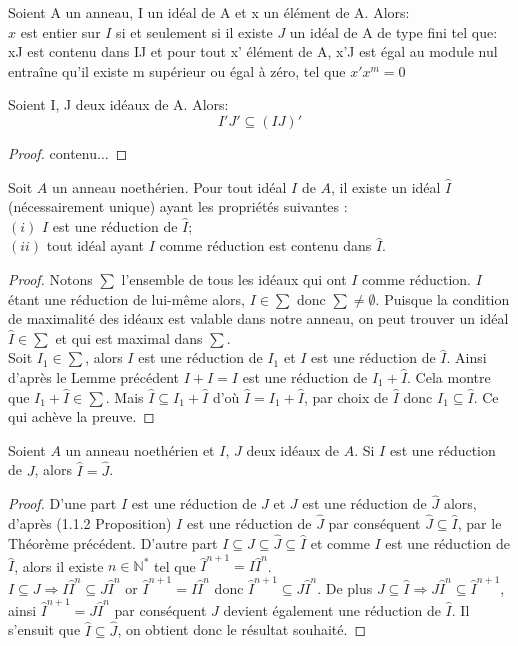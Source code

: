 \begin{maproposition}
	Soient A un anneau, I un idéal de A et x un élément de A. Alors:\\
	$x$ est entier sur $I$ si et seulement si il existe $J$ un idéal de A de type fini tel que: xJ est contenu dans IJ et pour tout x' élément de A, x'J est égal au module nul entraîne qu'il existe m supérieur ou égal à zéro, tel que $x'x^m = 0$
\end{maproposition}
\begin{moncorollaire}
	Soient I, J deux idéaux de A. Alors:
	\[ I'J' \subseteq (IJ)' \]
\end{moncorollaire}
\begin{proof}
	contenu...
\end{proof}
\begin{montheoreme}
	Soit $A$ un anneau noethérien.
	Pour tout idéal $I$ de $A$, il existe un idéal $\hat{I}$ (nécessairement unique) ayant les propriétés suivantes : \\
	$(i)$ $I$ est une réduction de $\hat{I}$;\\
	$(ii)$ tout idéal ayant $I$ comme réduction est contenu dans $\hat{I}$.
\end{montheoreme}
\begin{proof}
	Notons $\displaystyle \sum$ l'ensemble de tous les idéaux qui ont $I$ comme réduction. $I$ étant une réduction de lui-même alors, $I \in \displaystyle \sum$ donc $\displaystyle \sum \neq \emptyset$. Puisque la condition de maximalité des idéaux est valable dans notre anneau, on peut trouver un idéal $\hat{I} \in \displaystyle \sum$ et qui est maximal dans $\displaystyle \sum$.\\
	Soit $I_1 \in \displaystyle \sum$, alors $I$ est une réduction de $I_1$ et $I$ est une réduction de $\hat{I}$. Ainsi d'après le Lemme précédent $I+I=I$ est une réduction de $I_1+\hat{I}$. Cela montre que $I_1+\hat{I} \in \displaystyle \sum$. Mais $\hat{I} \subseteq I_1+\hat{I}$ d'où $\hat{I} = I_1+\hat{I}$, par choix de $\hat{I}$ donc $I_1 \subseteq \hat{I}$. Ce qui achève la preuve.
\end{proof} 
\begin{moncorollaire}
	Soient $A$ un anneau noethérien et $I$, $J$ deux idéaux de $A$. Si $I$ est une réduction de $J$, alors $\hat{I} = \hat{J}$.
\end{moncorollaire}
\begin{proof}
	D'une part $I$ est une réduction de $J$ et $J$ est une réduction de $\hat{J}$ alors, d'après (1.1.2 Proposition) $I$ est une réduction de $\hat{J}$ par conséquent $\hat{J} \subseteq \hat{I}$, par le Théorème précédent. D'autre part $I \subseteq J \subseteq \hat{J} \subseteq \hat{I}$ et comme $I$ est une réduction de $\hat{I}$, alors il existe $n \in \mathbb{N^*}$ tel que $\hat{I}^{n+1} = I \hat{I}^n$.\\
	$I \subseteq J \Rightarrow I \hat{I}^n \subseteq J \hat{I}^n$ or $\hat{I}^{n+1} = I \hat{I}^n$ donc $\hat{I}^{n+1} \subseteq J \hat{I}^n$. De plus $J \subseteq \hat{I} \Rightarrow  J \hat{I}^n \subseteq \hat{I}^{n+1}$, ainsi $\hat{I}^{n+1} = J \hat{I}^n$ par conséquent $J$ devient également une réduction de $\hat{I}$. Il s'ensuit que $\hat{I} \subseteq \hat{J}$, on obtient donc le résultat souhaité.
\end{proof}
